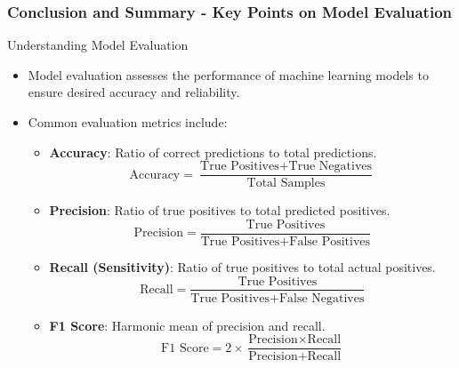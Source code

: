 \documentclass[aspectratio=169]{beamer}
\begin{document}
\begin{frame}[fragile]
    \frametitle{Conclusion and Summary - Key Points on Model Evaluation}
    \begin{block}{Understanding Model Evaluation}
        \begin{itemize}
            \item Model evaluation assesses the performance of machine learning models to ensure desired accuracy and reliability.
            \item Common evaluation metrics include:
            \begin{itemize}
                \item \textbf{Accuracy}: Ratio of correct predictions to total predictions.
                \begin{equation}
                    \text{Accuracy} = \frac{\text{True Positives} + \text{True Negatives}}{\text{Total Samples}}
                \end{equation}
                \item \textbf{Precision}: Ratio of true positives to total predicted positives.
                \begin{equation}
                    \text{Precision} = \frac{\text{True Positives}}{\text{True Positives} + \text{False Positives}}
                \end{equation}
                \item \textbf{Recall (Sensitivity)}: Ratio of true positives to total actual positives.
                \begin{equation}
                    \text{Recall} = \frac{\text{True Positives}}{\text{True Positives} + \text{False Negatives}}
                \end{equation}
                \item \textbf{F1 Score}: Harmonic mean of precision and recall.
                \begin{equation}
                    \text{F1 Score} = 2 \times \frac{\text{Precision} \times \text{Recall}}{\text{Precision} + \text{Recall}}
                \end{equation}
            \end{itemize}
        \end{itemize}
    \end{block}
\end{frame}
\end{document}

